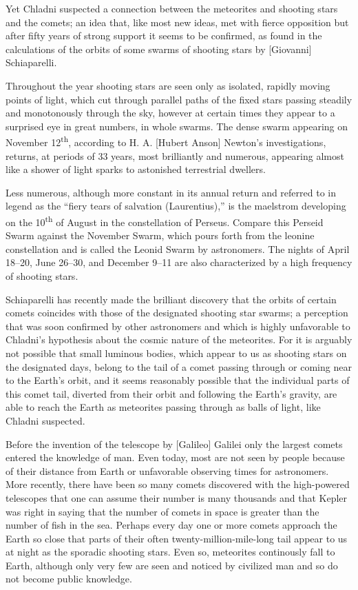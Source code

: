 \documentclass[a4paper, 12pt, oneside]{article}
\begin{document}
Yet Chladni suspected a connection between the meteorites and shooting stars and the comets; an idea that, like most new ideas, met with fierce opposition but after fifty years of strong support it seems to be confirmed, as found in the calculations of the orbits of some swarms of shooting stars by [Giovanni] Schiaparelli.

Throughout the year shooting stars are seen only as isolated, rapidly moving points of light, which cut through parallel paths of the fixed stars passing steadily and monotonously through the sky, however at certain times they appear to a surprised eye in great numbers, in whole swarms. The dense swarm appearing on November 12\textsuperscript{th}, according to H. A. [Hubert Anson] Newton's investigations, returns, at periods of 33 years, most brilliantly and numerous, appearing almost like a shower of light sparks to astonished terrestrial dwellers.

Less numerous, although more constant in its annual return and referred to in legend as the ``fiery tears of salvation (Laurentius),'' is the maelstrom developing on the 10\textsuperscript{th} of August in the constellation of Perseus. Compare this Perseid Swarm against the November Swarm, which pours forth from the leonine constellation and is called the Leonid Swarm by astronomers. The nights of April 18--20, June 26--30, and December 9--11 are also characterized by a high frequency of shooting stars.

Schiaparelli has recently made the brilliant discovery that the orbits of certain comets coincides with those of the designated shooting star swarms; a perception that was soon confirmed by other astronomers and which is highly unfavorable to Chladni's hypothesis about the cosmic nature of the meteorites. For it is arguably not possible that small luminous bodies, which appear to us as shooting stars on the designated days, belong to the tail of a comet passing through or coming near to the Earth's orbit, and it seems reasonably possible that the individual parts of this comet tail, diverted from their orbit and following the Earth's gravity, are able to reach the Earth as meteorites passing through as balls of light, like Chladni suspected.

Before the invention of the telescope by [Galileo] Galilei only the largest comets entered the knowledge of man. Even today, most are not seen by people because of their distance from Earth or unfavorable observing times for astronomers. More recently, there have been so many comets discovered with the high-powered telescopes that one can assume their number is many thousands and that Kepler was right in saying that the number of comets in space is greater than the number of fish in the sea. Perhaps every day one or more comets approach the Earth so close that parts of their often twenty-million-mile-long tail appear to us at night as the sporadic shooting stars. Even so, meteorites continously fall to Earth, although only very few are seen and noticed by civilized man and so do not become public knowledge.
\end{document}

